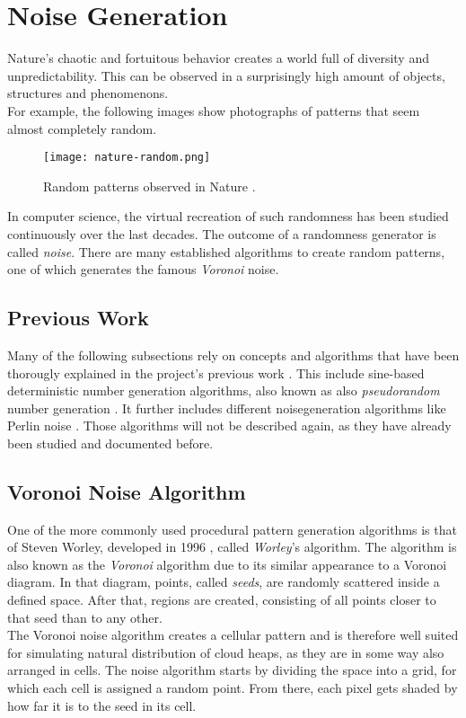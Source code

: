 \section{Noise Generation}
\label{section:noise}
Nature's chaotic and fortuitous behavior creates a world full of diversity and unpredictability.
This can be observed in a surprisingly high amount of objects, structures and phenomenons.
\\
For example, the following images show photographs of patterns that seem almost completely random.

\begin{figure}[H]
    \texttt{[image: nature-random.png]}
    \caption{Random patterns observed in Nature \protect\cite{bookofshaders:noise}.}
    \label{img:rnd:natural}
\end{figure}

\noindent
In computer science, the virtual recreation of such randomness has been studied continuously over the last decades.
The outcome of a randomness generator is called \emph{\gls{noise}}.
There are many established algorithms to create random patterns, one of which generates the famous \emph{Voronoi} \gls{noise}.

\subsection{Previous Work}
Many of the following subsections rely on concepts and algorithms that have been thorougly explained in the project's previous work \cite{project2:noise}.
This include sine-based deterministic number generation algorithms, also known as also \emph{\gls{pseudorandom}} number generation \cite{project2:noise:pseudo}.
It further includes different \gls{noisegeneration} algorithms like Perlin \gls{noise} \cite{project2:noise:perlin}.
\emptyline
Those algorithms will not be described again, as they have already been studied and documented before.

\pagebreak

\subsection{Voronoi Noise Algorithm}
\label{section:noise:voronoi}
One of the more commonly used procedural pattern generation algorithms is that of Steven Worley, developed in 1996 \cite{worley}, called \emph{Worley}'s algorithm.
The algorithm is also known as the \emph{Voronoi} algorithm due to its similar appearance to a Voronoi diagram.
In that diagram, points, called \emph{seeds}, are randomly scattered inside a defined space.
After that, regions are created, consisting of all points closer to that seed than to any other.
\\
The Voronoi \gls{noise} algorithm creates a cellular pattern and is therefore well suited for simulating natural distribution of cloud heaps, as they are in some way also arranged in cells.
\emptyline
The \gls{noise} algorithm starts by dividing the space into a grid, for which each cell is assigned a random point.
From there, each pixel gets shaded by how far it is to the seed in its cell.

